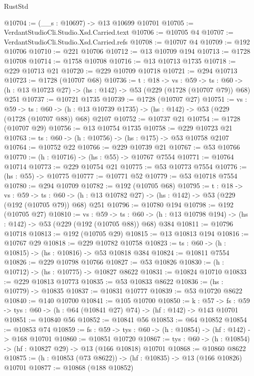 \begin{lexlean}{RustStd}
\begin{coremodule}
@10704 := (__s : @10697) -> @13 @10699 @10701
@10705 := VerdantStudioCli.Studio.Xsd.Carried.text
@10706 := @10705 @4
@10707 := VerdantStudioCli.Studio.Xsd.Carried.refs
@10708 := @10707 @4
@10709 := @192 @10706
@10710 := @221 @10706
@10712 := @13 @10709 @194
@10713 := @1728 @10708
@10714 := @1758 @10708
@10716 := @13 @10713 @1735
@10718 := @229 @10713 @21
@10720 := @229 @10709 @10718
@10721 := @294 @10713
@10723 := @1728 (@10707 @68)
@10736 := {t : @18} ->
  {vs : @59} ->
  {ts : @60} -> (h : @13 @10723 @27) -> (hs : @142) -> @53 (@229 (@1728 (@10707 @79)) @68) @251
@10737 := @10721 @1735
@10739 := @1728 (@10707 @27)
@10751 := {vs : @59} ->
  {ts : @60} -> (h : @13 @10739 @1735) -> (hs : @142) -> @53 (@229 (@1728 (@10707 @88)) @68) @2107
@10752 := @10737 @21
@10754 := @1728 (@10707 @29)
@10756 := @13 @10754 @1735
@10758 := @229 @10723 @21
@10763 := {ts : @60} -> (h : @10756) -> (hs : @175) -> @53 @10758 @2107
@10764 := @10752 @22
@10766 := @229 @10739 @21
@10767 := @53 @10766
@10770 := (h : @10716) -> (hs : @55) -> @10767 @7554
@10771 := @10764 @10714
@10773 := @229 @10754 @21
@10775 := @53 @10773 @7554
@10776 := (hs : @55) -> @10775
@10777 := @10771 @52
@10779 := @53 @10718 @7554
@10780 := @294 @10709
@10782 := @192 (@10705 @68)
@10795 := {t : @18} ->
  {vs : @59} ->
  {ts : @60} -> (h : @13 @10782 @27) -> (hs : @142) -> @53 (@229 (@192 (@10705 @79)) @68) @251
@10796 := @10780 @194
@10798 := @192 (@10705 @27)
@10810 := {vs : @59} ->
  {ts : @60} -> (h : @13 @10798 @194) -> (hs : @142) -> @53 (@229 (@192 (@10705 @88)) @68) @384
@10811 := @10796 @10718
@10813 := @192 (@10705 @29)
@10815 := @13 @10813 @194
@10816 := @10767 @29
@10818 := @229 @10782 @10758
@10823 := {ts : @60} -> (h : @10815) -> (hs : @10816) -> @53 @10818 @384
@10824 := @10811 @7554
@10826 := @229 @10798 @10766
@10827 := @53 @10826
@10830 := (h : @10712) -> (hs : @10775) -> @10827 @8622
@10831 := @10824 @10710
@10833 := @229 @10813 @10773
@10835 := @53 @10833 @8622
@10836 := (hs : @10779) -> @10835
@10837 := @10831 @10777
@10839 := @53 @10720 @8622
@10840 := @140 @10700
@10841 := @105 @10700
@10850 := {k : @57} ->
  {fs : @59} -> {tys : @60} -> (h : @64 (@10841 @27) @74) -> (hf : @142) -> @143 @10701
@10851 := @10840 @56
@10852 := @10841 @56
@10853 := @64 @10852
@10854 := @10853 @74
@10859 := {fs : @59} -> {tys : @60} -> (h : @10854) -> (hf : @142) -> @168 @10701
@10860 := @10851 @10720
@10867 := {tys : @60} -> (h : @10854) -> (hf : @10827 @29) -> @13 (@166 @10818) @10701
@10868 := @10860 @8622
@10875 := (h : @10853 (@73 @8622)) -> (hf : @10835) -> @13 (@166 @10826) @10701
@10877 := @10868 (@188 @10852)

\end{coremodule}
\end{lexlean}
